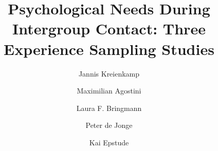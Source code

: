 \documentclass[man, 12pt, a4paper, donotrepeattitle]{apa7}
\title{Psychological Needs During Intergroup Contact: Three Experience Sampling Studies}
\author[*,1]{Jannis Kreienkamp}
\author[1]{Maximilian Agostini}
\author[1]{Laura F. Bringmann}
\author[1]{Peter de Jonge}
\author[1]{Kai Epstude}
\affiliation{\hfill}
\affil[1]{University of Groningen, Department of Psychology}
\begin{document}

\makeatletter
\vspace*{3em}
\begin{center}
\noindent \textbf\@title
\vspace{1em}
\noindent \@author
\end{center}
\vspace{5em}
\begin{center}%
    \textbf\acksname%
\end{center}%
\vspace{-1em}
\protect\raggedright
\setlength{\parindent}{0.5in}
\indent\par\@acks%

\printbibliography
\end{document}
